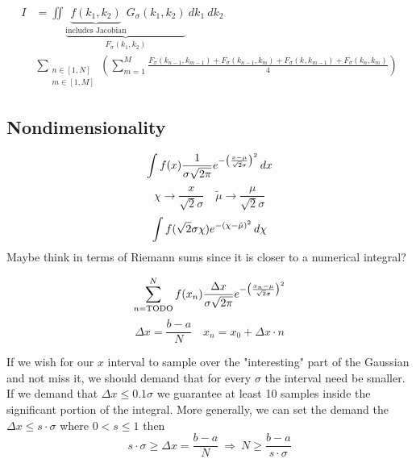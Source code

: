 \begin{align}
I&=\iint\limits \underbrace{ \underbrace{ f(k_{1},k_{2}) }_{ \text{includes Jacobian} } G_{\sigma}(k_{1}, k_{2})  }_{ F_{\sigma}(k_{1},k_{2}) }\  dk_{1} \ dk_{2} \\
&\sum\limits_{\substack{n\in [1,N]  \\ m \in [1,M]}}\left( \sum\limits_{m=1}^{M} \frac{F_{\sigma}(k_{n-1},k_{m-1})+F_{\sigma}(k_{n-1},k_{m})+F_{\sigma}(k_{},k_{m-1})+F_{\sigma}(k_{n},k_{m})}{4} \right) 
\label{eq:delta_2d_integral}
\end{align}

\newpage
\subsection{Nondimensionality}

\begin{equation}
\int\limits f(x) \frac{1}{\sigma \sqrt{ 2\pi }} {\Large e^{- \left( \frac{x-\mu}{\sqrt{ 2 }\sigma} \right)^{2} }} \, dx 
\label{eq:delta_nondimensionality_start}
\end{equation}
\begin{equation}
\chi \to \frac{x}{\sqrt{ 2 }\sigma} \quad \tilde{\mu}\to \frac{\mu}{\sqrt{ 2 }\sigma} 
\label{eq:delta_nondimensionality_change}
\end{equation}
\begin{equation}
\int\limits f(\sqrt{ 2 }\sigma\chi) {\Large e^{ -(\chi-\tilde{\mu})^{2} }} \, d\chi
\label{eq:delta_nondimensionality_result}
\end{equation}
Maybe think in terms of Riemann sums since it is closer to a numerical integral?

\begin{equation}
\sum\limits_{n=\text{TODO}}^{N}f(x_{n})  \frac{\Delta x}{\sigma \sqrt{ 2\pi }} {\Large e^{- \left( \frac{x_{n}-\mu}{\sqrt{ 2 }\sigma} \right)^{2} }}
\label{eq:delta_riemann_sum}
\end{equation}
\begin{equation}
\Delta x = \frac{b-a}{N} \quad x_{n} = x_{0}+\Delta x\cdot n
\label{eq:delta_dx_definition}
\end{equation}

If we wish for our $x$ interval to sample over the "interesting" part of the Gaussian and not miss it, we should demand that for every $\sigma$ the interval need be smaller. If we demand that $\Delta x \leq 0.1\sigma$ we guarantee at least 10 samples inside the significant portion of the integral. More generally, we can set the demand the $\Delta x\leq s\cdot\sigma$ where $0<s\leq 1$ then
\begin{equation}
s\cdot\sigma \geq \Delta x = \frac{b-a}{N} \ \Longrightarrow \ N \geq \frac{b-a}{s\cdot\sigma}
\label{eq:delta_sampling_condition}
\end{equation}

